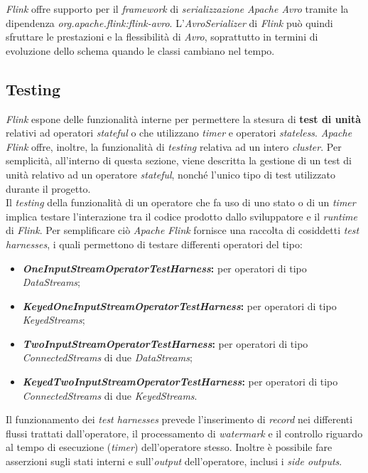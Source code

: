 \label{sec:avro}
\noindent \textit{Flink} offre supporto per il \textit{\textit{\gls{framework}}} di \textit{\gls{serializzazione}} \textit{Apache Avro} tramite la dipendenza \textit{org.apache.flink:flink-avro}. L'\textit{AvroSerializer} di \textit{Flink} può quindi sfruttare le prestazioni e la flessibilità di \textit{Avro}, soprattutto in termini di evoluzione dello schema quando le classi cambiano nel tempo.

\subsection{Testing}\label{sec:flink-testing}
\textit{Flink} espone delle funzionalità interne per permettere la stesura di \textbf{test di unità} relativi ad operatori \textit{\gls{stateful}} o che utilizzano \textit{timer} e operatori \textit{\gls{stateless}}. \textit{Apache Flink} offre, inoltre, la funzionalità di \textit{testing} relativa ad un intero \textit{\gls{cluster}}. Per semplicità, all'interno di questa sezione, viene descritta la gestione di un test di unità relativo ad un operatore \textit{\gls{stateful}}, nonché l'unico tipo di test utilizzato durante il progetto.\\
Il \textit{testing} della funzionalità di un operatore che fa uso di uno stato o di un \textit{timer} implica testare l'interazione tra il codice prodotto dallo sviluppatore e il \textit{runtime} di \textit{Flink}. Per semplificare ciò \textit{Apache Flink} fornisce una raccolta di cosiddetti \textit{test harnesses}, i quali permettono di testare differenti operatori del tipo:
\begin{itemize}
	\item{\textbf{\textit{OneInputStreamOperatorTestHarness}:} per operatori di tipo \textit{DataStreams};}
	\item{\textbf{\textit{KeyedOneInputStreamOperatorTestHarness}:} per operatori di tipo \textit{KeyedStreams};}
	\item{\textbf{\textit{TwoInputStreamOperatorTestHarness}:} per operatori di tipo \textit{ConnectedStreams} di due \textit{DataStreams};}
	\item{\textbf{\textit{KeyedTwoInputStreamOperatorTestHarness}:} per operatori di tipo \textit{ConnectedStreams} di due \textit{KeyedStreams}.}
\end{itemize}

Il funzionamento dei \textit{test harnesses} prevede l'inserimento di \textit{record} nei differenti flussi trattati dall'operatore, il processamento di \textit{watermark} e il controllo riguardo al tempo di esecuzione (\textit{timer}) dell'operatore stesso. Inoltre è possibile fare asserzioni sugli stati interni e sull'\textit{output} dell'operatore, inclusi i \textit{side outputs}. 



